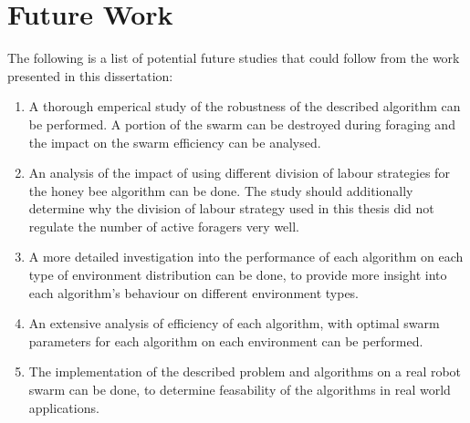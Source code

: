 
\section{Future Work}
\label{sec:conclusions:future_work}

The following is a list of potential future studies that could follow from the work presented in this dissertation:

\begin{enumerate}
    \item A thorough emperical study of the robustness of the described algorithm can be performed. A portion of the swarm can be destroyed during foraging and the impact on the swarm efficiency can be analysed.
    \item An analysis of the impact of using different division of labour strategies for the honey bee algorithm can be done. The study should additionally determine why the division of labour strategy used in this thesis did not regulate the number of active foragers very well.
    \item A more detailed investigation into the performance of each algorithm on each type of environment distribution can be done, to provide more insight into each algorithm's behaviour on different environment types.
    \item An extensive analysis of efficiency of each algorithm, with optimal swarm parameters for each algorithm on each environment can be performed.
    \item The implementation of the described problem and algorithms on a real robot swarm can be done, to determine feasability of the algorithms in real world applications.   
\end{enumerate}


